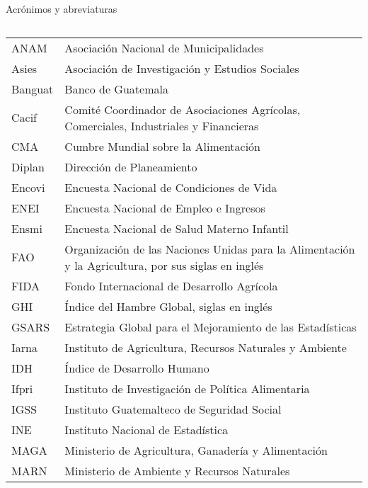 \newpage
	$\ $\\[-1cm]
 \textcolor{color2}{\Huge Acrónimos y abreviaturas}\\
	\normalsize	$\ $\\
\begin{center}\fontsize{3.8mm}{1.4em}\selectfont \setlength{\arrayrulewidth}{0.7pt}
	$\ $\\[-1.5cm]
	$\!$\begin{tabular}{p{4.3cm}l}	\hline
	ANAM	&	Asociación Nacional de Municipalidades	\\
\rowcolor{color1!5!white}	Asies	&	Asociación de Investigación y Estudios Sociales	\\
	Banguat	&	Banco de Guatemala	\\
\rowcolor{color1!5!white}	Cacif	&	Comité Coordinador de Asociaciones Agrícolas, Comerciales, Industriales y Financieras	\\
	CMA	&	Cumbre Mundial sobre la Alimentación	\\
\rowcolor{color1!5!white}	Diplan	&	Dirección de Planeamiento	\\
	Encovi	&	Encuesta Nacional de Condiciones de Vida	\\
\rowcolor{color1!5!white}	ENEI	&	Encuesta Nacional de Empleo e Ingresos	\\
	Ensmi	&	Encuesta Nacional de Salud Materno Infantil	\\
\rowcolor{color1!5!white}	FAO	&	Organización de las Naciones Unidas para la Alimentación y la Agricultura, por sus siglas en inglés	\\
	FIDA	&	Fondo Internacional de Desarrollo Agrícola	\\
\rowcolor{color1!5!white}	GHI	&	Índice del Hambre Global, siglas en inglés	\\
	GSARS	&	Estrategia Global para el Mejoramiento de las Estadísticas	\\
	\rowcolor{color1!5!white}Iarna	&	Instituto de Agricultura, Recursos Naturales y Ambiente	\\
		IDH	&	Índice de Desarrollo Humano\\
\rowcolor{color1!5!white}	Ifpri	&	Instituto de Investigación de Política Alimentaria	\\
	IGSS	&	Instituto Guatemalteco de Seguridad Social	\\
		\rowcolor{color1!5!white} INE	&	Instituto Nacional de Estadística\\
	MAGA	&	Ministerio de Agricultura, Ganadería y Alimentación	\\
	\rowcolor{color1!5!white}MARN	&	Ministerio de Ambiente y Recursos Naturales	\\

\end{tabular}
\end{center}
